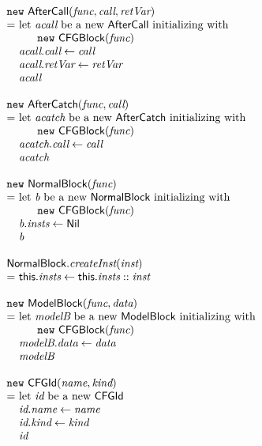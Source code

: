 \vspace*{-2em}
\[
\begin{array}{l@{}l@{~}l}
\lefteqn{\new\ \AfterCall(\emph{func}, \emph{call}, \emph{retVar})}\\
& = & \text{let } \emph{acall} \text{ be a new } \AfterCall \text{ initializing with}\\
&& \quad\ \ \new\ \CFGBlock(\emph{func})\\
& & \emph{acall}.\emph{call} \leftarrow \emph{call}\\
& & \emph{acall}.\emph{retVar} \leftarrow \emph{retVar}\\
& & \emph{acall}\\
& & \\

\lefteqn{\new\ \AfterCatch(\emph{func}, \emph{call})}\\
& = & \text{let } \emph{acatch} \text{ be a new } \AfterCatch \text{ initializing with }\\
& & \quad\ \ \new\ \CFGBlock(\emph{func})\\
& & \emph{acatch}.\emph{call} \leftarrow \emph{call}\\
& & \emph{acatch}\\
& & \\

\lefteqn{\new\ \NormalBlock(\emph{func})}\\
& = & \text{let } \emph{b} \text{ be a new } \NormalBlock \text{ initializing with }\\
& & \quad\ \ \new\ \CFGBlock(\emph{func})\\
& & \emph{b}.\emph{insts} \leftarrow \Nil \\
& & \emph{b}\\
& & \\

\lefteqn{\NormalBlock.\emph{createInst}(\emph{inst})}\\
& = & \this.\emph{insts} \leftarrow \this.\emph{insts} :: \emph{inst}\\
& & \\

\lefteqn{\new\ \ModelBlock(\emph{func}, \emph{data})}\\
& = & \text{let } \emph{modelB} \text{ be a new } \ModelBlock \text{ initializing with }\\
& & \quad\ \ \new\ \CFGBlock(\emph{func})\\
& & \emph{modelB}.\emph{data} \leftarrow \emph{data} \\
& & \emph{modelB}\\
& & \\

\lefteqn{\new\ \CFGId(\emph{name}, \emph{kind})}\\
& = & \text{let } \emph{id} \text{ be a new } \CFGId\\
& & \emph{id}.\emph{name} \leftarrow \emph{name} \\
& & \emph{id}.\emph{kind} \leftarrow \emph{kind} \\
& & \emph{id}\\
\end{array}
\]

